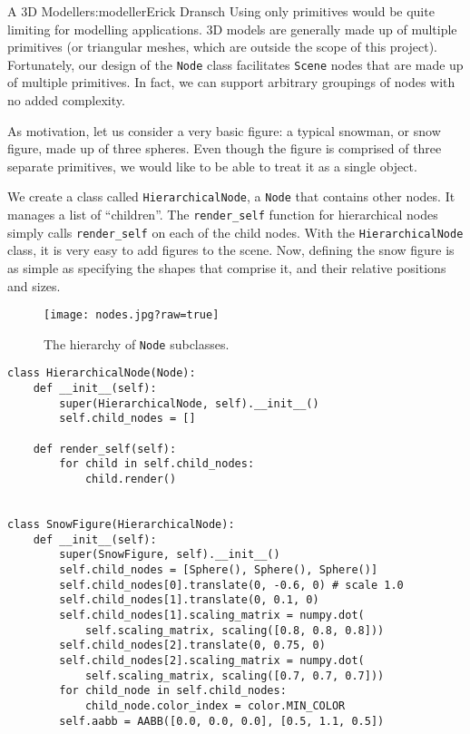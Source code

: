 \begin{aosachapter}{A 3D Modeller}{s:modeller}{Erick Dransch}
Using only primitives would be quite limiting for modelling
applications. 3D models are generally made up of multiple primitives (or
triangular meshes, which are outside the scope of this project).
Fortunately, our design of the \texttt{Node} class facilitates
\texttt{Scene} nodes that are made up of multiple primitives. In fact,
we can support arbitrary groupings of nodes with no added complexity.

As motivation, let us consider a very basic figure: a typical snowman,
or snow figure, made up of three spheres. Even though the figure is
comprised of three separate primitives, we would like to be able to
treat it as a single object.

We create a class called \texttt{HierarchicalNode}, a \texttt{Node} that
contains other nodes. It manages a list of ``children''. The
\texttt{render\_self} function for hierarchical nodes simply calls
\texttt{render\_self} on each of the child nodes. With the
\texttt{HierarchicalNode} class, it is very easy to add figures to the
scene. Now, defining the snow figure is as simple as specifying the
shapes that comprise it, and their relative positions and sizes.

\begin{figure}[htbp]
\centering
\texttt{[image: nodes.jpg?raw=true]}
\caption{The hierarchy of \texttt{Node} subclasses.}
\end{figure}

\begin{verbatim}
class HierarchicalNode(Node):
    def __init__(self):
        super(HierarchicalNode, self).__init__()
        self.child_nodes = []

    def render_self(self):
        for child in self.child_nodes:
            child.render()


class SnowFigure(HierarchicalNode):
    def __init__(self):
        super(SnowFigure, self).__init__()
        self.child_nodes = [Sphere(), Sphere(), Sphere()]
        self.child_nodes[0].translate(0, -0.6, 0) # scale 1.0
        self.child_nodes[1].translate(0, 0.1, 0)
        self.child_nodes[1].scaling_matrix = numpy.dot(
            self.scaling_matrix, scaling([0.8, 0.8, 0.8]))
        self.child_nodes[2].translate(0, 0.75, 0)
        self.child_nodes[2].scaling_matrix = numpy.dot(
            self.scaling_matrix, scaling([0.7, 0.7, 0.7]))
        for child_node in self.child_nodes:
            child_node.color_index = color.MIN_COLOR
        self.aabb = AABB([0.0, 0.0, 0.0], [0.5, 1.1, 0.5])
\end{verbatim}


\end{aosachapter}
